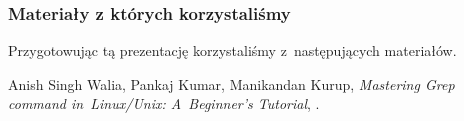 \documentclass[10pt,t]{beamer}
\begin{document}
\begin{frame}
  \frametitle{Materiały z których korzystaliśmy}


  Przygotowując tą prezentację korzystaliśmy z~następujących materiałów.

  Anish Singh Walia, Pankaj Kumar, Manikandan Kurup, \textit{Mastering Grep
    command in~Linux/Unix: A~Beginner's Tutorial},
  \parencite{WKK-Mastering-Grep-command-in-Linux-Unix-ETC-Ver-2026}.

\end{frame}










\appendix

















\printbibliography





\end{document}
